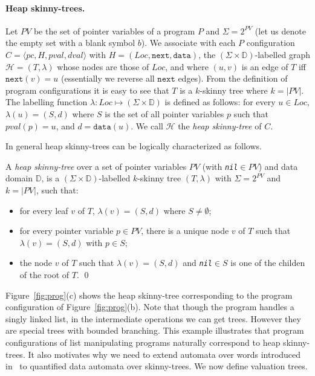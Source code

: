 \documentclass{llncs}
\newcommand{\tuple}[1]{\langle #1 \rangle}
\newcommand{\next}{\texttt{next}}
\newcommand{\Loc}{\mathit{Loc}}
\newcommand{\PV}{\mathit{PV}}
\newcommand{\dom}{\mathbb{D}}
\newcommand{\data}{\texttt{data}}
\newcommand{\nil}{{\texttt{nil}}}
\newcommand{\pc}{\mathit{pc}}
\newcommand{\heap}{H}
\newcommand{\pval}{\mathit{pval}}
\newcommand{\dval}{\mathit{dval}}
\newcommand{\HC}{\mathcal{H}}
\begin{document}
\paragraph{\bf Heap skinny-trees.} Let $\PV$ be the set of pointer variables of a program $P$ and $\Sigma=2^\PV$ (let us denote the empty set with a blank symbol $b$).
We associate with each $P$ configuration $C=\tuple{\pc, \heap, \pval, \dval}$ with $H=(\Loc, \next, \data)$, the $(\Sigma\times \dom)$-labelled graph $\HC=(T,\lambda)$ whose nodes are those of $\Loc$, and where $(u,v)$ is an edge of $T$ iff $\next(v)=u$ (essentially we reverse all $\next$ edges). From the definition of program configurations it is easy to see that $T$ is a $k$-skinny tree where $k=|\PV|$. The labelling function $\lambda:\Loc \mapsto(\Sigma\times \dom)$ is defined as follows: for every $u\in \Loc$, $\lambda(u)=(S,d)$ where $S$ is the set of all pointer variables $p$ such that $\pval(p)=u$, and $d=\data(u)$. We call $\HC$ the {\em heap skinny-tree} of $C$.

In general heap skinny-trees can be logically characterized as follows.

\begin{definition}
A {\em heap skinny-tree} over a set of pointer variables $\PV$ (with {\em \nil}$\in\PV $) and data domain $\dom$, is a $(\Sigma\times\dom)$-labelled $k$-skinny tree $(T,\lambda)$ with $\Sigma=2^\PV$ and $k=|\PV|$, such that:
\vspace{-0.1cm}
\begin{itemize}
\item for every leaf $v$ of $T$, $\lambda(v)=(S,d)$ where $S\not=\emptyset$;

\item for every pointer variable $p\in\PV$, there is a unique node $v$ of $T$ such that $\lambda(v)=(S,d)$ with $p\in S$;
\item the node $v$ of $T$ such that  $\lambda(v)=(S,d)$ and {\em \nil}$\in S$ is one of the childen of the root of $T$. \qed
\end{itemize}
\end{definition}

Figure~\ref{fig:prog}(c) shows the heap skinny-tree corresponding to the program configuration of Figure~\ref{fig:prog}(b). Note that though the program handles a singly linked list, in the intermediate operations we can get trees. However they are special trees with bounded branching.
This example illustrates that program configurations of list manipulating programs naturally correspond to heap skinny-trees. It also motivates why we need to extend automata over words introduced in~\cite{CAVQDA} to quantified data automata over skinny-trees.
We now define valuation trees.
\end{document}
